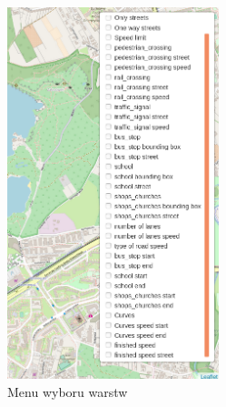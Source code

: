\begin{figure}[h]
\caption{Menu wyboru warstw}
\label{sec:mainLayerView}
\centering
\includegraphics[width=0.55\textwidth]{layerMenu}
\end{figure}

